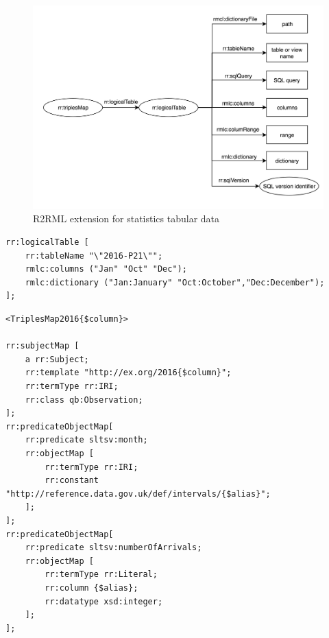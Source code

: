 \begin{figure}[!ht]
  \centering
  \includegraphics[width=1.0\linewidth]{figures/rmlc-iterator.png}
  \caption{R2RML extension for statistics tabular data}
  \label{fig:rmlc}
\end{figure}
\lstset{upquote=true}
\begin{lstlisting}[float,caption=Columns and dictionary properties in R2RML-Iterator,frame=tlrb,label={list:columns}, columns=fullflexible]
rr:logicalTable [
    rr:tableName "\"2016-P21\"";
    rmlc:columns ("Jan" "Oct" "Dec");
    rmlc:dictionary ("Jan:January" "Oct:October","Dec:December");
];
\end{lstlisting}

\begin{lstlisting}[float,caption=Iterator variables in the extension,frame=tlrb,label={list:iterator}, columns=fullflexible]
<TriplesMap2016{$column}>

rr:subjectMap [
    a rr:Subject;
    rr:template "http://ex.org/2016{$column}";
    rr:termType rr:IRI;
    rr:class qb:Observation;
];
rr:predicateObjectMap[
	rr:predicate sltsv:month;
    rr:objectMap [
    	rr:termType rr:IRI;
        rr:constant "http://reference.data.gov.uk/def/intervals/{$alias}";
    ];
];
rr:predicateObjectMap[
    rr:predicate sltsv:numberOfArrivals;
    rr:objectMap [
        rr:termType rr:Literal;
        rr:column {$alias};
        rr:datatype xsd:integer;
    ];
];
\end{lstlisting}
\lstset{upquote=false}



